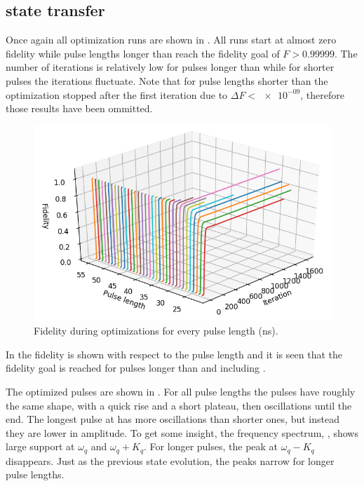 \documentclass[main.tex]{subfiles}
\begin{document}
\clearpage{}
\subsection{%
	\texorpdfstring{}{0 -> 2} state transfer
}
Once again all optimization runs are shown in .
All runs start at almost zero fidelity while pulse lengths longer than  reach the fidelity goal of \(F > 0.99999\).
The number of iterations is relatively low for pulses longer than  while for shorter pulses the iterations fluctuate.
Note that for pulse lengths shorter than  the optimization stopped after the first iteration due to \(\Delta F < \num{e-09}\), therefore those results have been ommitted.

\begin{figure}
    \centering
    \includegraphics[width=0.7\linewidth]{figs/3d-optim-gf.png}
	\caption{Fidelity during optimizations for every pulse length (ns).}%
	\label{fig:3d-optim-gf}
\end{figure}

In  the fidelity is shown with respect to the pulse length and it is seen that the fidelity goal is reached for pulses longer than and including .


The optimized pulses are shown in .
For all pulse lengths the pulses have roughly the same shape, with a quick rise and a short plateau, then oscillations until the end. 
The longest pulse at  has more oscillations than shorter ones, but instead they are lower in amplitude.
To get some insight, the frequency spectrum, , shows large support at \(\omega_q\) and \(\omega_q+K_q\). For longer pulses, the peak at \(\omega_q-K_q\) disappears.
Just as the previous state evolution, the peaks narrow for longer pulse lengths.
\end{document}
